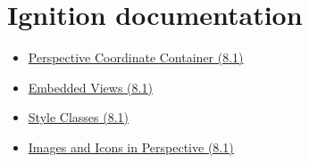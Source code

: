 \section*{Ignition documentation}
\begin{itemize}[leftmargin=*]
\item \href{https://www.docs.inductiveautomation.com/docs/8.1/appendix/components/perspective-components/perspective-container-palette/perspective-coordinate-container}{Perspective Coordinate Container (8.1)}
\item \href{https://www.docs.inductiveautomation.com/docs/8.1/ignition-modules/perspective/views-in-perspective/embedded-views}{Embedded Views (8.1)}
\item \href{https://www.docs.inductiveautomation.com/docs/8.1/ignition-modules/perspective/styles/style-classes}{Style Classes (8.1)}
\item \href{https://www.docs.inductiveautomation.com/docs/8.1/ignition-modules/perspective/working-with-perspective-components/images-and-icons-in-perspective}{Images and Icons in Perspective (8.1)}
\end{itemize}
